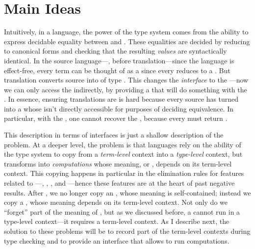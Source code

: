 \section{Main Ideas}
\label{sec:cps:cps:ideas}
\label{sec:cps:ideas}

Intuitively, in a  language, the power of the type
system comes from the ability to express decidable equality between
 and .
These equalities are decided by reducing  to canonical forms
and checking that the resulting \emph{values} are syntactically identical.
In the source language---\ie, before  translation---since the language
is effect-free, every term can be thought of as a  since every
 reduces to a .
But  translation converts source  into
 of type .
This changes the \emph{interface} to the ---now we can only access
the  indirectly, by providing a  that will do
something with the .
In essence, ensuring  translations are  is hard
because every source  has turned into a  whose
 isn't directly accessible for purposes of deciding
equivalence.
In particular, with the , one cannot recover
the , because every  must return
\im{\False}.

This description in terms of interfaces is just a shallow description
of the problem.
At a deeper level, the problem is that  languages rely
on the ability of the type system to copy  from a \emph{term-level}
context into a \emph{type-level} context, but  transforms
 into \emph{computations} whose meaning, or , depends on its term-level context.
This copying happens in particular in the elimination rules for features related
to ---\ie, , ,
and ---hence these features are at the heart of
past negative results.
After , we no longer copy an , whose meaning is self-contained; instead we copy a , whose meaning depends on its
term-level context.
Not only do we ``forget'' part of the meaning of , but as we
discussed before, a  cannot run in a type-level context---it requires
a term-level context.
As I describe next, the solution to these problems will be to record part of
the term-level contexts during type checking and to provide an interface that
allows  to run {computations}.

